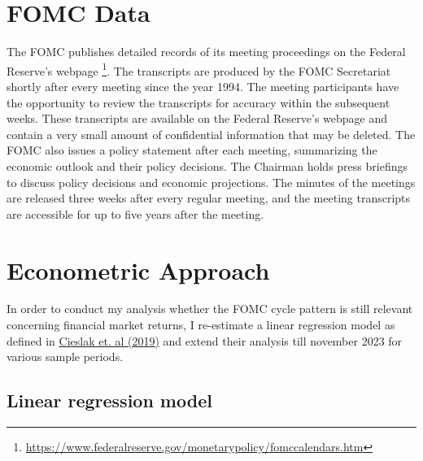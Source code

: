 \section{FOMC Data}

The FOMC publishes detailed records of its meeting proceedings on the Federal Reserve's webpage \footnote{\url{https://www.federalreserve.gov/monetarypolicy/fomccalendars.htm}}.  
The transcripts are produced by the FOMC Secretariat shortly after every meeting since the year 1994.
The meeting participants have the opportunity to review the transcripts for accuracy within the subsequent weeks. 
These transcripts are available on the Federal Reserve's webpage and contain a very small amount of confidential information that may be deleted. 
The FOMC also issues a policy statement after each meeting,  summarizing the economic outlook and their policy decisions. 
The Chairman holds press briefings to discuss policy decisions and economic projections. 
The minutes of the meetings are released three weeks after every regular meeting, and the meeting transcripts are accessible for up to five years after the meeting.

\section{Econometric Approach}

In order to conduct my analysis whether the FOMC cycle pattern is still relevant concerning financial market returns, I re-estimate a linear regression model as defined in \hyperref[item:cieslak_stock_2019]{Cieslak et. al (2019)} and extend their analysis till november 2023 for various sample periods.

\subsection{Linear regression model}

